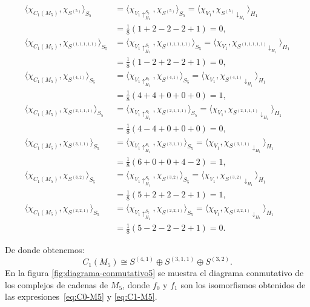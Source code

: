 \documentclass[12pt]{book}
\theoremstyle{definition}
\newcounter{in}
\begin{document}
{\footnotesize%
  \begin{align*}
    \langle\chi_{C_{1}(M_{5})},\chi_{S^{(5)}}\rangle_{S_{5}}&=\langle\chi_{V_{1}\uparrow^{S_{5}}_{H_1}},\chi_{S^{(5)}}\rangle_{S_{5}}=\langle\chi_{V_{1}},\chi_{S^{(5)}\downarrow_{H_{1}}}\rangle_{H_{1}}\\
    &=\frac{1}{8}(1+2-2-2+1)=0,\\
    \langle\chi_{C_{1}(M_{5})},\chi_{S^{(1,1,1,1,1)}}\rangle_{S_{5}}&=\langle\chi_{V_{1}\uparrow^{S_{5}}_{H_1}},\chi_{S^{(1,1,1,1,1)}}\rangle_{S_{5}}=\langle\chi_{V_{1}},\chi_{S^{(1,1,1,1,1)}\downarrow_{H_{1}}}\rangle_{H_{1}}\\
    &=\frac{1}{8}(1-2+2-2+1)=0, \\
    \langle\chi_{C_{1}(M_{5})},\chi_{S^{(4,1)}}\rangle_{S_{5}}&=\langle\chi_{V_{1}\uparrow^{S_{5}}_{H_1}},\chi_{S^{(4,1)}}\rangle_{S_{5}}=\langle\chi_{V_{1}},\chi_{S^{(4,1)}\downarrow_{H_{1}}}\rangle_{H_{1}}\\
    &=\frac{1}{8}(4+4+0+0+0)=1, \\
    \langle\chi_{C_{1}(M_{5})},\chi_{S^{(2,1,1,1)}}\rangle_{S_{5}}&=\langle\chi_{V_{1}\uparrow^{S_{5}}_{H_1}},\chi_{S^{(2,1,1,1)}}\rangle_{S_{5}}=\langle\chi_{V_{1}},\chi_{S^{(2,1,1,1)}\downarrow_{H_{1}}}\rangle_{H_{1}}\\
    &=\frac{1}{8}(4-4+0+0+0)=0, \\
    \langle\chi_{C_{1}(M_{5})},\chi_{S^{(3,1,1)}}\rangle_{S_{5}}&=\langle\chi_{V_{1}\uparrow^{S_{5}}_{H_1}},\chi_{S^{(3,1,1)}}\rangle_{S_{5}}=\langle\chi_{V_{1}},\chi_{S^{(3,1,1)}\downarrow_{H_{1}}}\rangle_{H_{1}}\\
    &=\frac{1}{8}(6+0+0+4-2)=1, \\
    \langle\chi_{C_{1}(M_{5})},\chi_{S^{(3,2)}}\rangle_{S_{5}}&=\langle\chi_{V_{1}\uparrow^{S_{5}}_{H_1}},\chi_{S^{(3,2)}}\rangle_{S_{5}}=\langle\chi_{V_{1}},\chi_{S^{(3,2)}\downarrow_{H_{1}}}\rangle_{H_{1}}\\
    &=\frac{1}{8}(5+2+2-2+1)=1, \\
    \langle\chi_{C_{1}(M_{5})},\chi_{S^{(2,2,1)}}\rangle_{S_{5}}&=\langle\chi_{V_{1}\uparrow^{S_{5}}_{H_1}},\chi_{S^{(2,2,1)}}\rangle_{S_{5}}=\langle\chi_{V_{1}},\chi_{S^{(2,2,1)}\downarrow_{H_{1}}}\rangle_{H_{1}}\\
    &=\frac{1}{8}(5-2-2-2+1)=0.
  \end{align*}
}

De donde obtenemos:
\begin{equation}
  \label{eq:C1-M5}
  C_{1}(M_{5})\cong S^{(4,1)}\oplus S^{(3,1,1)}\oplus S^{(3,2)}.
\end{equation}
En la figura \ref{fig:diagrama-conmutativo5} se muestra el diagrama
conmutativo de los complejos de cadenas de $M_{5}$, donde $f_{0}$ y
$f_{1}$ son los isomorfismos obtenidos de las expresiones~\ref{eq:C0-M5} y \ref{eq:C1-M5}.
\end{document}
